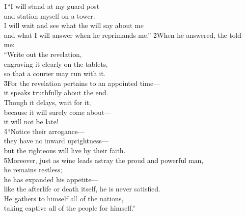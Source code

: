 \begin{poetry}
\poeml {}
\v{1}``I will stand at my guard post \\
\poeml and station myself on a tower. \\
\poeml I will wait and see what the  will say about me \\
\poemll    and what I will answer when he reprimands me.''
\poeml \v{2}When he answered, the  told me: \\
\poeml ``Write out the revelation, \\
\poemll    engraving it clearly on the tablets, \\
\poemlll       so that a courier may run with it. \\
\poeml \v{3}For the revelation pertains to an appointed time--- \\
\poemll    it speaks truthfully about the end. \\
\poeml Though it delays, wait for it, \\
\poemll    because it will surely come about--- \\
\poemlll       it will not be late! \\
\poeml \v{4}``Notice their arrogance--- \\
\poemll    they have no inward uprightness--- \\
\poemlll       but the righteous will live by their faith. \\
\poeml \v{5}Moreover, just as wine leads astray the proud and powerful man, \\
\poemll    he remains restless; \\
\poeml he has expanded his appetite--- \\
\poemll    like the afterlife or death itself, he is never satisfied. \\
\poeml He gathers to himself all of the nations, \\
\poemll    taking captive all of the people for himself.''

\end{poetry}
